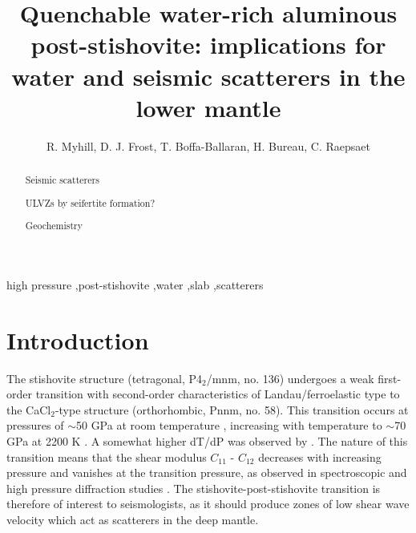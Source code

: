 \documentclass[review]{elsarticle}
\begin{document}
\begin{frontmatter}

\title{Quenchable water-rich aluminous post-stishovite: implications for water and seismic scatterers in the lower mantle}

\author{R. Myhill, D. J. Frost, T. Boffa-Ballaran, H. Bureau, C. Raepsaet}
\address{Bayerisches Geoinstitut, Universit\"{a}t Bayreuth, Universit\"{a}tsstrasse 30, 95447 Bayreuth, Germany}

\begin{abstract}
  Seismic scatterers

  ULVZs by seifertite formation?

  Geochemistry
\end{abstract}

\begin{keyword}
high pressure \sep post-stishovite \sep water \sep slab \sep scatterers
\end{keyword}

\end{frontmatter}

\linenumbers

\section{Introduction}

The stishovite structure (tetragonal, P4$_2$/mnm, no. 136) undergoes a weak first-order transition \citep{AFGH1998, HSCHMK2000} with second-order characteristics of Landau/ferroelastic type \citep{TY1989, CHM2000} to the CaCl$_2$-type structure (orthorhombic, Pnnm, no. 58). This transition occurs at pressures of $\sim$50 GPa at room temperature \citep{KCHM1995, AFGH1998}, increasing with temperature to $\sim$70 GPa at 2200 K \citep{HTSO2005,Nomuraetal2010}. A somewhat higher dT/dP was observed by \cite{OHMI2002}. The nature of this transition means that the shear modulus $C_{11}$ - $C_{12}$ decreases with increasing pressure and vanishes at the transition pressure, as observed in spectroscopic and high pressure diffraction studies \citep{KCHM1995, SDL2002}. The stishovite-post-stishovite transition is therefore of interest to seismologists, as it should produce zones of low shear wave velocity which act as scatterers in the deep mantle.
\end{document}
